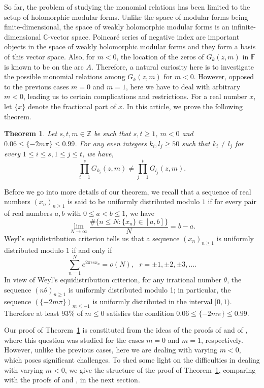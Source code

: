 \documentclass[12pt,reqno]{amsart}
\newcommand{\F}{{\mathbb F}}
\newcommand{\Z}{{\mathbb Z}}
\newcommand{\C}{{\mathbb C}}
\newtheorem{thm}{Theorem}
\newcommand{\thmref}[1]{Theorem~\ref{#1}}
\begin{document}
 So far, the problem of studying the monomial relations has been limited to the 
 setup of holomorphic modular forms. Unlike the space of modular forms 
 being finite-dimensional, the space of weakly holomorphic modular forms is 
 an infinite-dimensional $\C$-vector space. Poincar\'e series of negative index are important objects in the space of weakly holomorphic modular forms and they form a basis of this vector space. Also, for $m<0$, the location of the zeros of $G_k(z,m)$ in $\F$ is known to be on the arc $A$. 
 Therefore, a natural curiosity here is to investigate the possible monomial relations among $G_k(z,m)$ for $m<0$.
However, opposed to the previous cases $m=0$ and 
$m=1$, here we have to deal with arbitrary $m<0$, leading us to certain complications and restrictions. For a real number $x$, let $\{x\}$ denote the fractional part of $x$. In this article, we prove the following theorem.
\begin{thm}\label{main}
Let $s,t,m\in\Z$ be such that $s,t\ge1$, $m<0$ and $0.06\le\{-2m\pi\}\le0.99$. 
For any even integers $k_i,l_j\ge 50$ such that $k_i\neq l_j$ for every $1\le i\le s, 1\le j\le t$,
we have,
$$
\prod_{i=1}^sG_{k_i}(z,m)\neq\prod_{j=1}^tG_{l_j}(z,m).
$$
\end{thm}

Before we go into more details of our theorem, we recall that a sequence of real numbers $(x_n)_{n\ge1}$ is said to be uniformly distributed modulo $1$ if for every pair of real numbers $a,b$
with $0\le a<b\le 1$, we have 
$$
\lim_{N\to\infty}\frac{\#\{n\le N: \{x_n\}\in[a,b]\}}{N}=b-a.
$$
Weyl's equidistribution criterion \cite[Theorem 11.1.5]{RM} tells us that a sequence $(x_n)_{n\ge1}$ is uniformly 
distributed modulo $1$ if and only if 
$$
\sum_{n=1}^{N}e^{2\pi\iota r x_n}=o(N), \ \ \ r=\pm1,\pm2,\pm3,\ldots.
$$
In view of Weyl's equidistribution criterion, for any irrational number $\theta$, the sequence 
$(n\theta)_{n\ge1}$ is uniformly distributed modulo 1; in particular, the sequence 
$(\{-2m\pi\})_{m\le-1}$ is uniformly distributed in the interval $[0,1)$. Therefore at least $93\%$ of $m\le 0$
 satisfies the condition $0.06\le \{-2m\pi\}\le 0.99$.
 
Our proof of \thmref{main} is constituted from the ideas of the proofs of \cite[Theorem 1.1]{GKP} and of
\cite[Theorem 1]{KS2}, where this question was studied for the cases $m=0$ and $m=1$, respectively. However, unlike the previous 
cases, here we are dealing with varying $m<0$, which poses significant challenges.
 To shed some light on the difficulties in dealing with varying $m<0$, we give the structure of the proof of \thmref{main}, comparing with the proofs of \cite[Theorem 1.1]{GKP} and
\cite[Theorem 1]{KS2}, in the next section.
\end{document}
